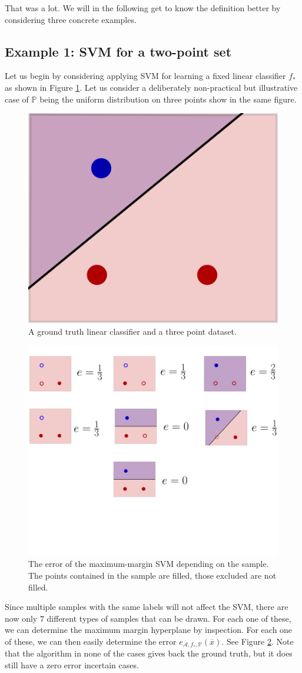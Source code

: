 \documentclass{article}
\newcommand{\calA}{\mathcal{A}}
\begin{document}
That was a lot. We will in the following get to know the definition better by considering three concrete examples.

\subsection{Example 1: SVM for a two-point set}
Let us begin by considering applying SVM for learning a fixed linear classifier $f_*$ as shown in Figure \ref{fig:gt_svm}. Let us consider a deliberately non-practical but illustrative case of $\mathbb{P}$ being the uniform distribution on three points show in the same figure.

\begin{figure} 
    \centering\includegraphics[width=0.5\linewidth]{graphics/ground_truth_svm.png}
    \caption{A ground truth linear classifier and a three point dataset.}
  \label{fig:gt_svm}
\end{figure}

\begin{figure} 
    \centering\includegraphics[width=0.5\linewidth]{graphics/error_svm.png}
    \caption{The error of the maximum-margin SVM depending on the sample. The points contained in the sample are filled, those excluded are not filled.}

    \label{fig:errors_svm}
\end{figure}

Since multiple samples with the same labels will not affect the SVM, there are now only $7$ different types of samples that can be drawn. For each one of these, we can determine the maximum margin hyperplane by inspection. For each one of these, we can then easily determine the error $e_{\calA,f_*,\mathbb{P}}(\overline{x})$. See Figure \ref{fig:errors_svm}. Note that the algorithm in none of the cases gives back the ground truth, but it does still have a zero error incertain cases.
\end{document}
